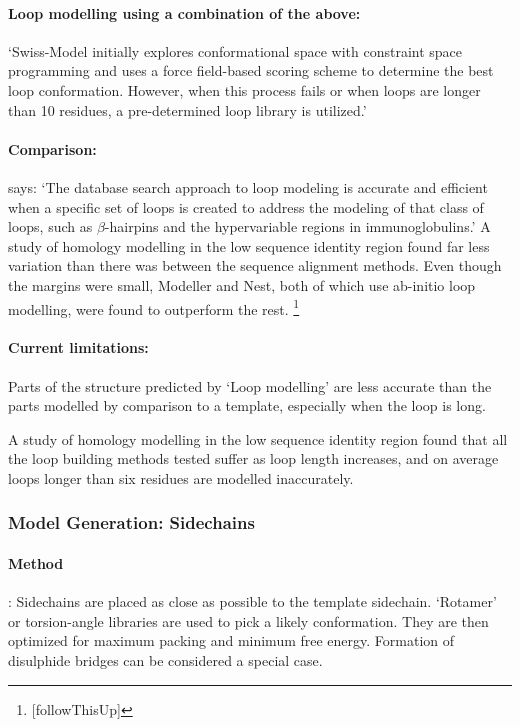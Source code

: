 \documentclass[10pt]{report}
\begin{document}
\paragraph{Loop modelling using a combination of the above:} `Swiss-Model initially explores conformational space with constraint space programming and uses a force field-based scoring scheme to determine the best loop conformation. However, when this process fails or when loops are longer than 10 residues, a pre-determined loop library is utilized.' \cite{dalton07}

\paragraph{Comparison:} \cite{marti-renom2000com} says: `The database search approach to loop modeling is accurate and efficient when a specific set of loops is created to address the modeling of that class of loops, such as $\beta$-hairpins and the hypervariable regions in immunoglobulins.' A study of homology modelling in the low sequence identity region found far less variation than there was between the sequence alignment methods. Even though the margins were small, Modeller and Nest, both of which use ab-initio loop modelling, were found to outperform the rest. \cite{dalton07} \footnote{[followThisUp]}

\paragraph{Current limitations:} Parts of the structure predicted by `Loop modelling' are less accurate than the parts modelled by comparison to a template, especially when the loop is long.

A study of homology modelling in the low sequence identity region found that all the loop building methods tested suffer as loop length increases, and on average loops longer than six residues are modelled inaccurately. \cite{dalton07}

\subsubsection{Model Generation: Sidechains}

\paragraph{Method}: Sidechains are placed as close as possible to the template sidechain. `Rotamer' or torsion-angle libraries are used to pick a likely conformation. They are then optimized for maximum packing and minimum free energy. Formation of disulphide bridges can be considered a special case. \cite{marti-renom2000com}
\end{document}
